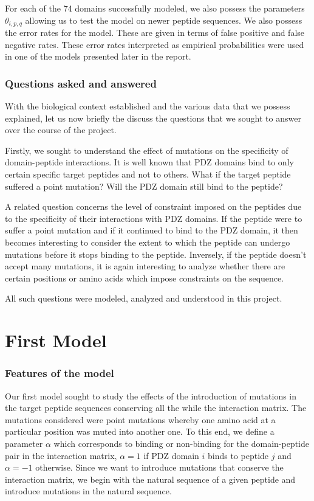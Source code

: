\documentclass[a4paper, 12pt]{article}
\begin{document}
	For each of the 74 domains successfully modeled, we also possess the parameters $\theta_{i,p,q}$ allowing us to test the model on newer peptide sequences. We also possess the error rates for the model. These are given in terms of false positive and false negative rates. These error rates interpreted as empirical probabilities were used in one of the models presented later in the report.

	\section{Questions asked and answered}

	With the biological context established and the various data that we possess explained, let us now briefly the discuss the questions that we sought to answer over the course of the project. 

	Firstly, we sought to understand the effect of mutations on the specificity of domain-peptide interactions. It is well known that PDZ domains bind to only certain specific target peptides and not to others. What if the target peptide suffered a point mutation? Will the PDZ domain still bind to the peptide? 

	A related question concerns the level of constraint imposed on the peptides due to the specificity of their interactions with PDZ domains. If the peptide were to suffer a point mutation and if it continued to bind to the PDZ domain, it then becomes interesting to consider the extent to which the peptide can undergo mutations before it stops binding to the peptide. Inversely, if the peptide doesn't accept many mutations, it is again interesting to analyze whether there are certain positions or amino acids which impose constraints on the sequence. 

	All such questions were modeled, analyzed and understood in this project.

\pagebreak
\part{First Model}
	\section{Features of the model}

	Our first model sought to study the effects of the introduction of mutations in the target peptide sequences conserving all the while the interaction matrix. The mutations considered were point mutations whereby one amino acid at a particular position was muted into another one. To this end, we define a parameter $\alpha$ which corresponds to binding or non-binding for the domain-peptide pair in the interaction matrix, $\alpha=1$ if PDZ domain $i$ binds to peptide $j$ and $\alpha = -1$ otherwise. Since we want to introduce mutations that conserve the interaction matrix, we begin with the natural sequence of a given peptide and introduce mutations in the natural sequence. 
\end{document}
